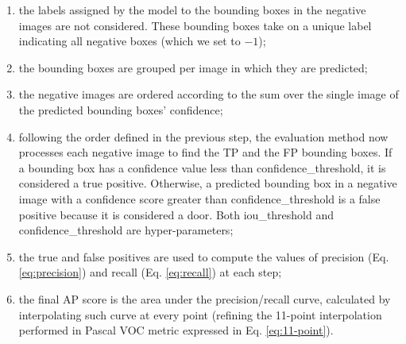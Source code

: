 \begin{enumerate}
	\item the labels assigned by the model to the bounding boxes in the negative images are not considered. These bounding boxes take on a unique label indicating all negative boxes (which we set to $ -1 $);
	\item the bounding boxes are grouped per image in which they are predicted;
	\item the negative images are ordered according to the sum over the single image of the predicted bounding boxes' confidence;
	\item following the order defined in the previous step, the evaluation method now processes each negative image to find the TP and the FP bounding boxes. If a bounding box has a confidence value less than \textsf{confidence\_threshold}, it is considered a true positive. Otherwise, a predicted bounding box in a negative image with a confidence score greater than \textsf{confidence\_threshold} is a false positive because it is considered a door. Both \textsf{iou\_threshold} and \textsf{confidence\_threshold} are hyper-parameters;
	\item the true and false positives are used to compute the values of precision (Eq. \ref{eq:precision}) and recall (Eq. \ref{eq:recall}) at each step; 
	\item the final AP score is the area under the precision/recall curve, calculated by interpolating such curve at every point (refining the 11-point interpolation performed in Pascal VOC metric expressed in Eq. \ref{eq:11-point}).
\end{enumerate}






